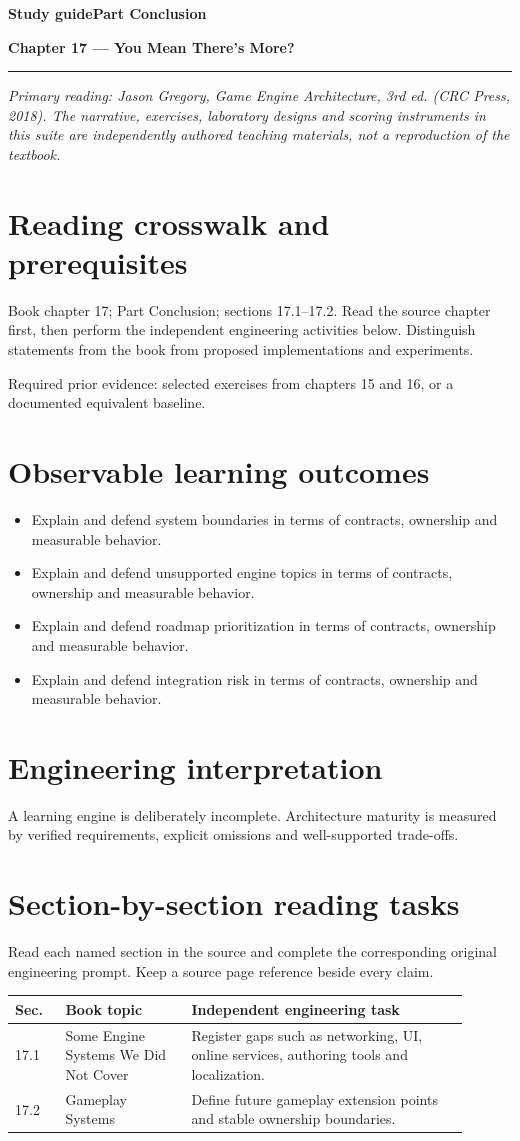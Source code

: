 \documentclass[11pt,letterpaper]{article}
\newcommand{\DocType}{Reference}
\newcommand{\SuiteHeading}[3]{%
\renewcommand{\DocType}{#2}%
{\small\bfseries\sffamily\color{EngineTeal}#2\hfill #3}\par\vspace{6pt}
{\LARGE\bfseries\color{EngineBlue}#1}\par\vspace{4pt}
{\color{EngineTeal}\rule{\linewidth}{1pt}}\par\vspace{7pt}}
\newcommand{\SourceNote}{\footnotesize\textit{Primary reading: Jason Gregory, \emph{Game Engine Architecture}, 3rd ed. (CRC Press, 2018). The narrative, exercises, laboratory designs and scoring instruments in this suite are independently authored teaching materials, not a reproduction of the textbook.}\normalsize\par}
\begin{document}
\SuiteHeading{Chapter 17 — You Mean There's More?}{Study guide}{Part Conclusion}
\SourceNote
\section{Reading crosswalk and prerequisites}
Book chapter 17; Part Conclusion; sections 17.1--17.2. Read the source chapter first, then perform the independent engineering activities below. Distinguish statements from the book from proposed implementations and experiments.

Required prior evidence: selected exercises from chapters 15 and 16, or a documented equivalent baseline.

\section{Observable learning outcomes}
\begin{itemize}
\item Explain and defend system boundaries in terms of contracts, ownership and measurable behavior.
\item Explain and defend unsupported engine topics in terms of contracts, ownership and measurable behavior.
\item Explain and defend roadmap prioritization in terms of contracts, ownership and measurable behavior.
\item Explain and defend integration risk in terms of contracts, ownership and measurable behavior.
\end{itemize}
\section{Engineering interpretation}
A learning engine is deliberately incomplete. Architecture maturity is measured by verified requirements, explicit omissions and well-supported trade-offs.

\section{Section-by-section reading tasks}
Read each named section in the source and complete the corresponding original engineering prompt. Keep a source page reference beside every claim.
\small\begin{longtable}{|p{0.10\linewidth}|p{0.25\linewidth}|p{0.55\linewidth}|}
\hline \textbf{Sec.} & \textbf{Book topic} & \textbf{Independent engineering task} \\ \hline\endhead
17.1 & Some Engine Systems We Did Not Cover & Register gaps such as networking, UI, online services, authoring tools and localization. \\ \hline
17.2 & Gameplay Systems & Define future gameplay extension points and stable ownership boundaries. \\ \hline
\end{longtable}\normalsize
\end{document}
